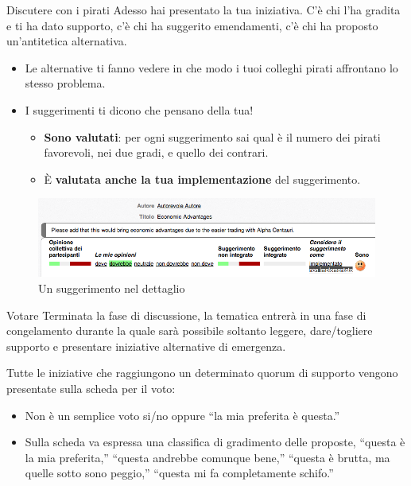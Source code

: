 \documentclass[ignorenonframetext]{beamer}\usetheme{default}
\begin{document}
\begin{frame}{Discutere con i pirati}
Adesso hai presentato la tua iniziativa. C'\`e chi l'ha gradita e ti ha dato supporto, c'\`e chi ha suggerito emendamenti, c'\`e chi ha proposto un'antitetica alternativa. \begin{itemize}\item Le alternative ti fanno vedere in che modo i tuoi colleghi pirati affrontano lo stesso problema. \item I suggerimenti ti dicono che pensano della tua!\begin{itemize}\item {\bfseries Sono valutati}: per ogni suggerimento sai qual \`e il numero dei pirati favorevoli, nei due gradi, e quello dei contrari. \item \`E {\bfseries valutata anche la tua implementazione} del suggerimento.\end{itemize}\end{itemize} \begin{figure}\includegraphics[width=\textwidth]{pics/suggerimento}
\caption{Un suggerimento nel dettaglio}
\end{figure}
\end{frame}

\begin{frame}{Votare}
Terminata la fase di discussione, la tematica entrer\`a in una fase di congelamento durante la quale sar\`a possibile soltanto leggere, dare/togliere supporto e presentare iniziative alternative di emergenza.

Tutte le iniziative che raggiungono un determinato quorum di supporto vengono presentate sulla scheda per il voto:\begin{itemize}\item Non \`e un semplice voto si/no oppure ``la mia preferita \`e questa.''\item Sulla scheda va espressa una classifica di gradimento delle proposte, ``questa \`e la mia preferita,'' ``questa andrebbe comunque bene,'' ``questa \`e brutta, ma quelle sotto sono peggio,'' ``questa mi fa completamente schifo.''\end{itemize}
\end{frame}
\end{document}
